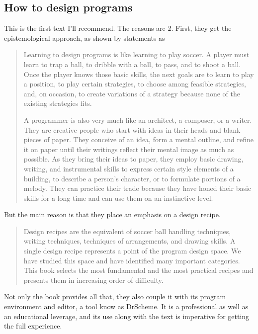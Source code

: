 \subsection{How to design programs}

This is the first text I'll recommend. The reasons are 2. First, they get the
epistemological approach, as shown by statements as

\begin{quotation}
    Learning to design programs is like learning to play soccer. A player must learn
    to trap a ball, to dribble with a ball, to pass, and to shoot a ball. Once the
    player knows those basic skills, the next goals are to learn to play a position,
    to play certain strategies, to choose among feasible strategies, and, on
    occasion, to create variations of a strategy because none of the existing
    strategies fits.

    A programmer is also very much like an architect, a composer, or a writer. They
    are creative people who start with ideas in their heads and blank pieces of
    paper. They conceive of an idea, form a mental outline, and refine it on paper
    until their writings reflect their mental image as much as possible. As they
    bring their ideas to paper, they employ basic drawing, writing, and instrumental
    skills to express certain style elements of a building, to describe a person's
    character, or to formulate portions of a melody. They can practice their trade
    because they have honed their basic skills for a long time and can use them on
    an instinctive level.
    \cite{education:felleisen__htdp}
\end{quotation}

But the main reason is that they place an emphasis on a design recipe. 

\begin{quotation}
Design recipes are the equivalent of soccer ball handling techniques, writing
techniques, techniques of arrangements, and drawing skills. A single design
recipe represents a point of the program design space. We have studied this
space and have identified many important categories. This book selects the most
fundamental and the most practical recipes and presents them in increasing order
of difficulty.
\cite{education:felleisen__htdp}
\end{quotation}

Not only the book provides all that, they also couple it with its program
environment and editor, a tool know as DrScheme. It is a professional as well as
an educational leverage, and its use along with the text is imperative for
getting the full experience.\cite{programming:falleisen__drscheme}

